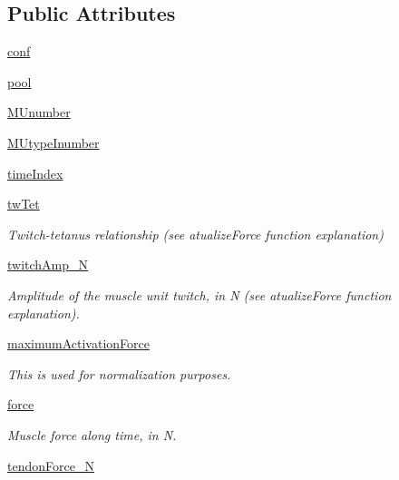 \subsection*{Public Attributes}
\begin{DoxyCompactItemize}
\item 
\hyperlink{class_muscle_hill_1_1_muscle_hill_a081599e4b3b4faf450f8c09e654ea188}{conf}
\item 
\hyperlink{class_muscle_hill_1_1_muscle_hill_ada7b7fe30c416aa6b7d957875ad81804}{pool}
\item 
\hyperlink{class_muscle_hill_1_1_muscle_hill_aad139563902bc26e0c69637ddc85c6b7}{M\+Unumber}
\item 
\hyperlink{class_muscle_hill_1_1_muscle_hill_ae7e7a4fe4112e6a88b04cfd8705e1374}{M\+Utype\+Inumber}
\item 
\hyperlink{class_muscle_hill_1_1_muscle_hill_ab4e1bd36001e334113d42cb8628b2b1d}{time\+Index}
\item 
\hyperlink{class_muscle_hill_1_1_muscle_hill_a9a5c6c65e918348944a07659d0ca8c98}{tw\+Tet}
\begin{DoxyCompactList}\small\item\em Twitch-\/tetanus relationship (see atualize\+Force function explanation) \end{DoxyCompactList}\item 
\hyperlink{class_muscle_hill_1_1_muscle_hill_ae53fd1d4eec68f1de4285211b73e1a13}{twitch\+Amp\+\_\+N}
\begin{DoxyCompactList}\small\item\em Amplitude of the muscle unit twitch, in N (see atualize\+Force function explanation). \end{DoxyCompactList}\item 
\hyperlink{class_muscle_hill_1_1_muscle_hill_af77dc4d25fcba310c45da4e6731cfd19}{maximum\+Activation\+Force}
\begin{DoxyCompactList}\small\item\em This is used for normalization purposes. \end{DoxyCompactList}\item 
\hyperlink{class_muscle_hill_1_1_muscle_hill_a033b2a780ba29f043a0a2ec03aeb079d}{force}
\begin{DoxyCompactList}\small\item\em Muscle force along time, in N. \end{DoxyCompactList}\item 
\hyperlink{class_muscle_hill_1_1_muscle_hill_a5a205c14ad64c72855c93bfe0abfcd15}{tendon\+Force\+\_\+N}

\end{DoxyCompactItemize}
